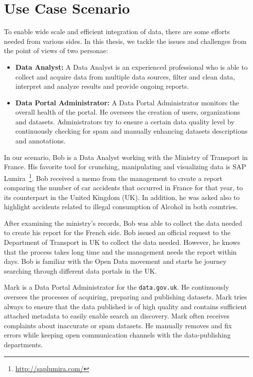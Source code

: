 \section{Use Case Scenario}

To enable wide scale and efficient integration of data, there are some efforts needed from various sides. In this thesis, we tackle the issues and challenges from the point of views of two personae:

\begin{itemize}
\item \textbf{Data Analyst:} A Data Analyst is an experienced professional who is able to collect and acquire data from multiple data sources, filter and clean data, interpret and analyze results and provide ongoing reports.
\item \textbf{Data Portal Administrator:} A Data Portal Administrator monitors the overall health of the portal. He oversees the creation of users, organizations and datasets. Administrators try to ensure a certain data quality level by continuously checking for spam and manually enhancing datasets descriptions and annotations.
\end{itemize}

In our scenario, Bob is a Data Analyst working with the Ministry of Transport in France. His favorite tool for crunching, manipulating and visualizing data is SAP Lumira~\footnote{\url{http://saplumira.com/}}. Bob received a memo from the management to create a report comparing the number of car accidents that occurred in France for that year, to its counterpart in the United Kingdom (UK). In addition, he was asked also to highlight accidents related to illegal consumption of Alcohol in both countries.

After examining the ministry's records, Bob was able to collect the data needed to create his report for the French side. Bob issued an official request to the Department of Transport in UK  to collect the data needed. However, he knows that the process takes long time and the management needs the report within days. Bob is familiar with the Open Data movement and starts he journey searching through different data portals in the UK.

Mark is a Data Portal Administrator for the \texttt{data.gov.uk}. He continuously oversees the processes of acquiring, preparing and publishing datasets. Mark tries always to ensure that the data published is of high quality and contains sufficient attached metadata to easily enable search an discovery. Mark often receives complaints about inaccurate or spam datasets. He manually removes and fix errors while keeping open communication channels with the data-publishing departments.

